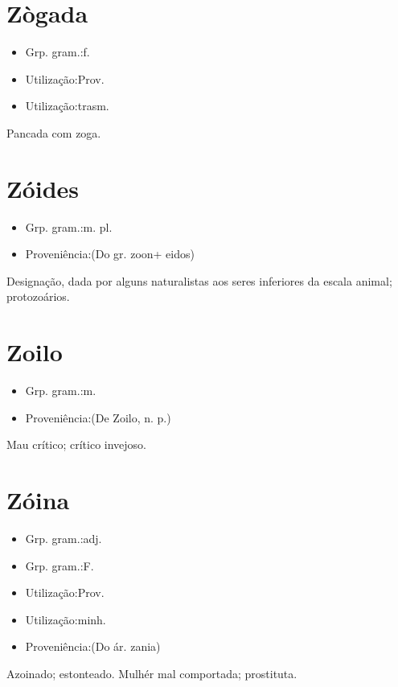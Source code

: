 \section{Zògada}
\begin{itemize}
\item {Grp. gram.:f.}
\end{itemize}
\begin{itemize}
\item {Utilização:Prov.}
\end{itemize}
\begin{itemize}
\item {Utilização:trasm.}
\end{itemize}
Pancada com zoga.
\section{Zóides}
\begin{itemize}
\item {Grp. gram.:m. pl.}
\end{itemize}
\begin{itemize}
\item {Proveniência:(Do gr. \textunderscore zoon\textunderscore  + \textunderscore eidos\textunderscore )}
\end{itemize}
Designação, dada por alguns naturalistas aos seres inferiores da escala animal; protozoários.
\section{Zoilo}
\begin{itemize}
\item {Grp. gram.:m.}
\end{itemize}
\begin{itemize}
\item {Proveniência:(De \textunderscore Zoilo\textunderscore , n. p.)}
\end{itemize}
Mau crítico; crítico invejoso.
\section{Zóina}
\begin{itemize}
\item {Grp. gram.:adj.}
\end{itemize}
\begin{itemize}
\item {Grp. gram.:F.}
\end{itemize}
\begin{itemize}
\item {Utilização:Prov.}
\end{itemize}
\begin{itemize}
\item {Utilização:minh.}
\end{itemize}
\begin{itemize}
\item {Proveniência:(Do ár. \textunderscore zania\textunderscore )}
\end{itemize}
Azoinado; estonteado.
Mulhér mal comportada; prostituta.
